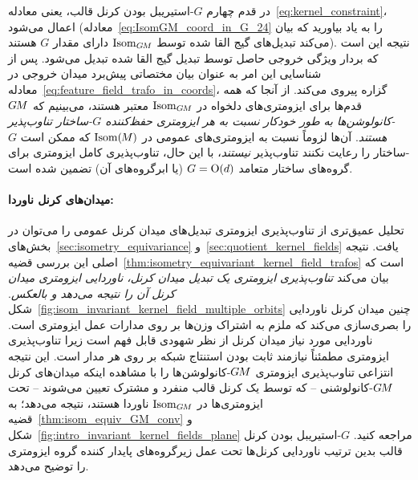 در قدم چهارم $G$-استیریبل بودن کرنل قالب، یعنی معادله~\eqref{eq:kernel_constraint}، اعمال می‌شود (معادله~\eqref{eq:IsomGM_coord_in_G_24} را به یاد بیاورید که بیان می‌کند تبدیل‌های گیج القا شده توسط $\operatorname{Isom}_{G\mkern-1.4muM}$ دارای مقدار $G$ هستند).
نتیجه این است که بردار ویژگی خروجی حاصل توسط تبدیل گیج القا شده تبدیل می‌شود.
پس از شناسایی این امر به عنوان بیان مختصاتی پیش‌برد میدان خروجی در معادله~\eqref{eq:feature_field_trafo_in_coords}، گزاره پیروی می‌کند.
از آنجا که همه قدم‌ها برای ایزومتری‌های دلخواه در $\operatorname{Isom}_{G\mkern-1.4muM}$ معتبر هستند، می‌بینیم که \emph{$G\mkern-1.4muM$-کانولوشن‌ها به طور خودکار نسبت به هر ایزومتری حفظ‌کننده $G$-ساختار تناوب‌پذیر هستند}.
آن‌ها لزوماً نسبت به ایزومتری‌های عمومی در $\operatorname{Isom}(\mkern-1.5mu M \mkern-.5mu)$ که ممکن است $G$-ساختار را رعایت نکنند تناوب‌پذیر \emph{نیستند}، با این حال، تناوب‌پذیری کامل ایزومتری برای گروه‌های ساختار متعامد $G=\operatorname{O}(d)$ (یا ابرگروه‌های آن) تضمین شده است.



\paragraph{میدان‌های کرنل ناوردا:}
تحلیل عمیق‌تری از تناوب‌پذیری ایزومتری تبدیل‌های میدان کرنل عمومی را می‌توان در بخش‌های~\ref{sec:isometry_equivariance} و~\ref{sec:quotient_kernel_fields} یافت.
نتیجه اصلی این بررسی قضیه~\ref{thm:isometry_equivariant_kernel_field_trafos} است که بیان می‌کند \emph{تناوب‌پذیری ایزومتری یک تبدیل میدان کرنل، ناوردایی ایزومتری میدان کرنل آن را نتیجه می‌دهد و بالعکس}.
شکل~\ref{fig:isom_invariant_kernel_field_multiple_orbits} چنین میدان کرنل ناوردایی را بصری‌سازی می‌کند که ملزم به اشتراک وزن‌ها بر روی مدارات عمل ایزومتری است.
ناوردایی مورد نیاز میدان کرنل از نظر شهودی قابل فهم است زیرا تناوب‌پذیری ایزومتری مطمئناً نیازمند ثابت بودن استنتاج شبکه بر روی هر مدار است.
این نتیجه انتزاعی تناوب‌پذیری ایزومتری $G\mkern-1.4muM$-کانولوشن‌ها را با مشاهده اینکه میدان‌های کرنل $G\mkern-1.4muM$-کانولوشنی -- که توسط یک کرنل قالب منفرد و مشترک تعیین می‌شوند -- تحت ایزومتری‌ها در $\operatorname{Isom}_{G\mkern-1.4muM}$ ناوردا هستند، نتیجه می‌دهد؛ به قضیه~\ref{thm:isom_equiv_GM_conv} و شکل~\ref{fig:intro_invariant_kernel_fields_plane} مراجعه کنید.
$G$-استیریبل بودن کرنل قالب بدین ترتیب ناوردایی کرنل‌ها تحت عمل زیرگروه‌های پایدار کننده گروه ایزومتری را توضیح می‌دهد.



